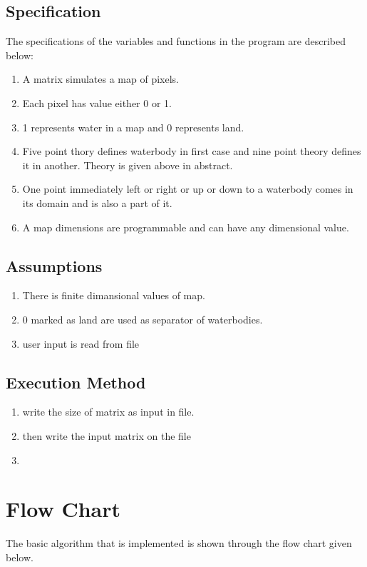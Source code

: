 \documentclass [12 pt ]{article}
\begin{document}
 \subsection{Specification}
 The specifications of the variables and functions in the program are described below:
  \begin{enumerate}
   
  \item A matrix simulates a map of pixels.
  \item Each pixel has value either 0 or 1.
  \item 1 represents water in a map and 0 represents land.
  \item Five point thory defines waterbody in first case and nine point theory defines it in another. Theory is given above in abstract.
  \item One point immediately left or right or up or down to a waterbody comes in its domain and is also a part of it.
  \item A map dimensions are programmable and can have any dimensional value.

  

 \end{enumerate}
 \subsection{ Assumptions }
 \begin{enumerate}
 \item There is finite dimansional values of map.
 \item 0 marked as land are used as separator of waterbodies.
 \item user input is read from file
 \end{enumerate}

 \newpage
 \subsection{ Execution Method }
 \begin{enumerate}
 \item write the size of matrix as input in file.
 \item then write the input matrix on the file 
 \item 
 \end{enumerate}

 \newpage
 \section{Flow Chart}
 The basic algorithm that is implemented is shown through the flow chart given below.
\end{document}
